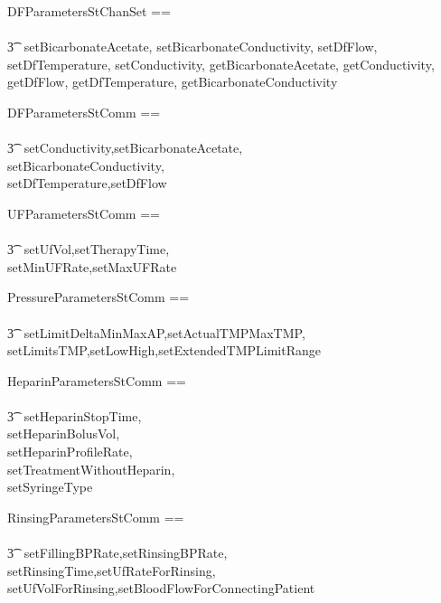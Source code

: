 \begin{circus}
  \circchanset DFParametersStChanSet ==\\
  \\\t3 \lchanset~setBicarbonateAcetate,
  setBicarbonateConductivity, setDfFlow,
  setDfTemperature, setConductivity,
  getBicarbonateAcetate, getConductivity,
  getDfFlow, getDfTemperature,
  getBicarbonateConductivity~\rchanset
\end{circus}
\begin{circus}
  \circchanset DFParametersStComm ==\\
  \\\t3 \lchanset~setConductivity,setBicarbonateAcetate,\\
      setBicarbonateConductivity,\\
      setDfTemperature,setDfFlow~\rchanset
\end{circus}

\begin{circus}
  \circchanset UFParametersStComm ==\\
  \\\t3 \lchanset~setUfVol,setTherapyTime,\\
      setMinUFRate,setMaxUFRate~\rchanset
\end{circus}
\begin{circus}
  \circchanset PressureParametersStComm ==\\
  \\\t3 \lchanset~setLimitDeltaMinMaxAP,setActualTMPMaxTMP,\\
      setLimitsTMP,setLowHigh,setExtendedTMPLimitRange~\rchanset
\end{circus}
\begin{circus}
  \circchanset HeparinParametersStComm ==\\
  \\\t3 \lchanset~setHeparinStopTime,\\
      setHeparinBolusVol,\\
      setHeparinProfileRate,\\
      setTreatmentWithoutHeparin,\\
      setSyringeType~\rchanset
\end{circus}
\begin{circus}
  \circchanset RinsingParametersStComm ==\\
  \\\t3 \lchanset~setFillingBPRate,setRinsingBPRate,\\
    setRinsingTime,setUfRateForRinsing,\\
    setUfVolForRinsing,setBloodFlowForConnectingPatient\rchanset
\end{circus}


